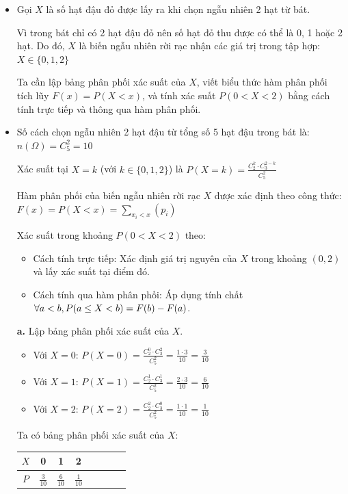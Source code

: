 \documentclass[12pt]{article}
\begin{document}
\begin{itemize}
    \item Gọi $X$ là số hạt đậu đỏ được lấy ra khi chọn ngẫu nhiên 2 hạt từ bát. 
    
    Vì trong bát chỉ có 2 hạt đậu đỏ nên số hạt đỏ thu được có thể là 0, 1 hoặc 2 hạt. Do đó, $X$ là biến ngẫu nhiên rời rạc nhận các giá trị trong tập hợp:  $X \in \{0, 1, 2\}$
    
    Ta cần lập bảng phân phối xác suất của $X$, viết biểu thức hàm phân phối tích lũy $F(x) = P(X < x)$, và tính xác suất $P(0 < X < 2)$ bằng cách tính trực tiếp và thông qua hàm phân phối.

    \item Số cách chọn ngẫu nhiên 2 hạt đậu từ tổng số 5 hạt đậu trong bát là:
    $ n(\Omega) = C_5^2 = 10 $
    
    Xác suất tại $X = k$ (với $k \in \{0, 1, 2\}$) là $\displaystyle P(X = k) = \frac{C_2^k \cdot C_3^{2-k}}{C_5^2}$
    
    Hàm phân phối của biến ngẫu nhiên rời rạc $X$ được xác định theo công thức: \\ $\displaystyle F(x) = P(X < x) = \sum_{x_i < x} (p_i)$
    
    Xác suất trong khoảng $P(0 < X < 2)$ theo:
    \begin{itemize}
        \item Cách tính trực tiếp: Xác định giá trị nguyên của $X$ trong khoảng $(0, 2)$ và lấy xác suất tại điểm đó.
        \item Cách tính qua hàm phân phối: Áp dụng tính chất $ \forall a < b, \\P(a \le X < b) = F(b) - F(a)$.
    \end{itemize}

    \textbf{a.} Lập bảng phân phối xác suất của $X$.
    \begin{itemize}
        \item Với $X = 0$: $\displaystyle P(X = 0) = \frac{C_2^0 \cdot C_3^2}{C_5^2} = \frac{1 \cdot 3}{10} = \frac{3}{10}$
        \item Với $X = 1$: $\displaystyle P(X = 1) = \frac{C_2^1 \cdot C_3^1}{C_5^2} = \frac{2 \cdot 3}{10} = \frac{6}{10}$
        \item Với $X = 2$: $\displaystyle P(X = 2) = \frac{C_2^2 \cdot C_3^0}{C_5^2} = \frac{1 \cdot 1}{10} = \frac{1}{10}$
    \end{itemize}

    Ta có bảng phân phối xác suất của $X$:
    \begin{center}
        \begin{tabular}{|Sc|Sc|Sc|Sc|}
            \hline
            $X$ & 0 & 1 & 2 \\
            \hline
            \rule{0pt}{20pt}$P$ & $\displaystyle \frac{3}{10}$ & $\displaystyle \frac{6}{10}$ & $\displaystyle \frac{1}{10}$ \\ [6pt]
            \hline
        \end{tabular}
    \end{center}
    

\end{itemize}
\end{document}
